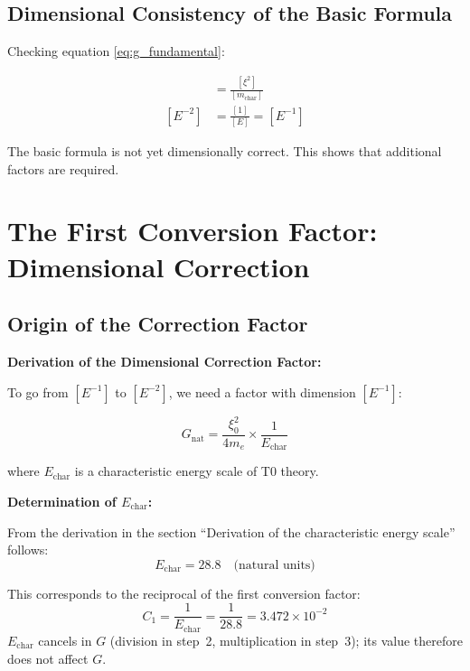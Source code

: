 	\subsection{Dimensional Consistency of the Basic Formula}
	
	Checking equation \eqref{eq:g_fundamental}:
	
	\begin{align}
		[G] &= \frac{[\xi^2]}{[m_{\text{char}}]} \\
		[E^{-2}] &= \frac{[1]}{[E]} = [E^{-1}]
	\end{align}
	
	The basic formula is not yet dimensionally correct. This shows that additional factors are required.
	
	\section{The First Conversion Factor: Dimensional Correction}
	
	\subsection{Origin of the Correction Factor}
	
	\begin{derivation}
		\textbf{Derivation of the Dimensional Correction Factor:}
		
		To go from $[E^{-1}]$ to $[E^{-2}]$, we need a factor with dimension $[E^{-1}]$:
		
		\begin{equation}
			G_{\text{nat}} = \frac{\xi_0^2}{4 m_e} \times \frac{1}{E_{\text{char}}}
		\end{equation}
		
		where $E_{\text{char}}$ is a characteristic energy scale of T0 theory.
		
		\textbf{Determination of $E_{\text{char}}$:}
		
		From the derivation in the section \enquote{Derivation of the characteristic energy scale} follows:
		\begin{equation}
			E_{\text{char}} = 28.8 \quad \text{(natural units)}
		\end{equation}
		
		This corresponds to the reciprocal of the first conversion factor:
		\begin{equation}
			C_1 = \frac{1}{E_{\text{char}}} = \frac{1}{28.8} = 3.472 \times 10^{-2}
		\end{equation}
		$E_{\text{char}}$ cancels in $G$ (division in step~2, multiplication in step~3); its value therefore does not affect $G$.
	\end{derivation}
	
